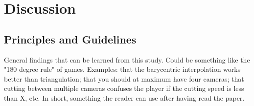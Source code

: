 \section{Discussion}
\subsection{Principles and Guidelines}
General findings that can be learned from this study. Could be something like the "180 degree rule" of games. Examples: that the barycentric interpolation works better than triangulation; that you should at maximum have four cameras; that cutting between multiple cameras confuses the player if the cutting speed is less than X, etc. In short, something the reader can use after having read the paper.